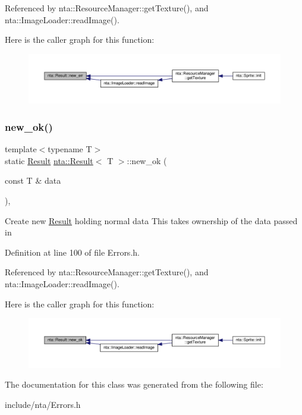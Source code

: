 Referenced by nta\+::\+Resource\+Manager\+::get\+Texture(), and nta\+::\+Image\+Loader\+::read\+Image().

Here is the caller graph for this function\+:
\nopagebreak
\begin{figure}[H]
\begin{center}
\leavevmode
\includegraphics[width=350pt]{d8/d2e/classnta_1_1Result_ad65a9140ae2a03cfb13bd30f848b1aa5_icgraph}
\end{center}
\end{figure}
\mbox{\label{classnta_1_1Result_af193a336ab789de94a975c6f0a039e40}} 
\subsubsection{\texorpdfstring{new\+\_\+ok()}{new\_ok()}}
{\footnotesize\ttfamily template$<$typename T$>$ \\
static \hyperlink{classnta_1_1Result}{Result} \hyperlink{classnta_1_1Result}{nta\+::\+Result}$<$ T $>$\+::new\+\_\+ok (\begin{DoxyParamCaption}\item[{const T \&}]{data }\end{DoxyParamCaption})\hspace{0.3cm}{\ttfamily [inline]}, {\ttfamily [static]}}

Create new \hyperlink{classnta_1_1Result}{Result} holding normal data This takes ownership of the data passed in 

Definition at line 100 of file Errors.\+h.



Referenced by nta\+::\+Resource\+Manager\+::get\+Texture(), and nta\+::\+Image\+Loader\+::read\+Image().

Here is the caller graph for this function\+:\nopagebreak
\begin{figure}[H]
\begin{center}
\leavevmode
\includegraphics[width=350pt]{d8/d2e/classnta_1_1Result_af193a336ab789de94a975c6f0a039e40_icgraph}
\end{center}
\end{figure}


The documentation for this class was generated from the following file\+:\begin{DoxyCompactItemize}
\item 
include/nta/Errors.\+h\end{DoxyCompactItemize}
